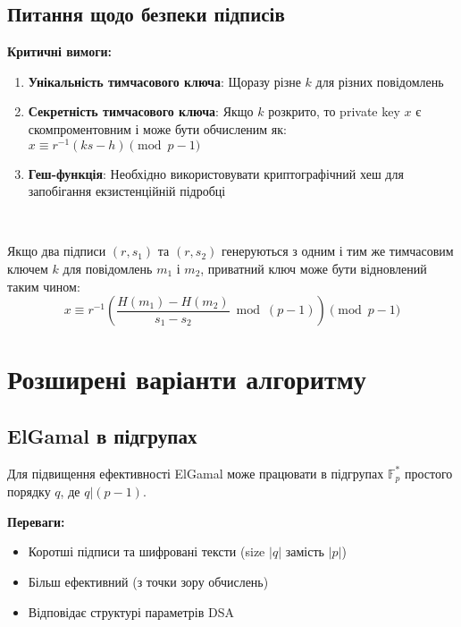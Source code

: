 \subsection{Питання щодо безпеки підписів}

\textbf{Критичні вимоги:}
\begin{enumerate}
    \item \textbf{Унікальність тимчасового ключа}: Щоразу різне $k$ для різних повідомлень
    \item \textbf{Секретність тимчасового ключа}: Якщо $k$ розкрито, то private key $x$ є скомпроментовним і може 
        бути обчисленим як: $x \equiv r^{-1}(ks - h) \pmod{p-1}$
    \item \textbf{Геш-функція}: Необхідно використовувати криптографічний хеш для запобігання екзистенційній підробці
\end{enumerate}

\begin{proposition}
    ~\par Якщо два підписи $(r, s_1)$ та $(r, s_2)$ генеруються з одним і тим же тимчасовим ключем $k$ для повідомлень 
    $m_1$ і $m_2$, приватний ключ може бути відновлений таким чином:
    \begin{equation*}
        x \equiv r^{-1} \left( \frac{H(m_1) - H(m_2)}{s_1 - s_2} \bmod (p-1) \right) \pmod{p-1}
    \end{equation*}
\end{proposition}

\section{Розширені варіанти алгоритму}

\subsection{ElGamal в підгрупах}

Для підвищення ефективності ElGamal може працювати в підгрупах $\mathbb{F}_p^*$ простого порядку $q$, де $q | (p-1)$.

\textbf{Переваги:}
\begin{itemize}
    \item Коротші підписи та шифровані тексти (size $|q|$ замість $|p|$)
    \item Більш ефективний (з точки зору обчислень)
    \item Відповідає структурі параметрів DSA
\end{itemize}

